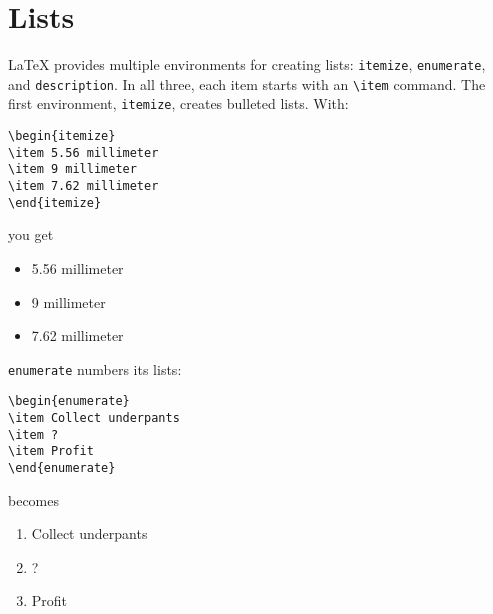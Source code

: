 \section{Lists}

\LaTeX{} provides multiple environments for creating lists:
\texttt{itemize}, \texttt{enumerate}, and \texttt{description}.
In all three, each item starts with an \verb|\item| command.
The first environment, \texttt{itemize}, creates bulleted lists.
With:
\begin{leftfigure}
\begin{lstlisting}
\begin{itemize}
\item 5.56 millimeter
\item 9 millimeter
\item 7.62 millimeter
\end{itemize}
\end{lstlisting}
\end{leftfigure}
you get
\begin{leftfigure}
\lm%
\begin{itemize}[leftmargin=*]
\item 5.56 millimeter
\item 9 millimeter
\item 7.62 millimeter
\end{itemize}
\end{leftfigure}

\bigskip
\noindent \texttt{enumerate} numbers its lists:
\begin{leftfigure}
\begin{lstlisting}
\begin{enumerate}
\item Collect underpants
\item ?
\item Profit
\end{enumerate}
\end{lstlisting}
\end{leftfigure}
becomes
\begin{leftfigure}
\lm%
\begin{enumerate}[leftmargin=*]
\item Collect underpants
\item ?
\item Profit
\end{enumerate}
\end{leftfigure}

